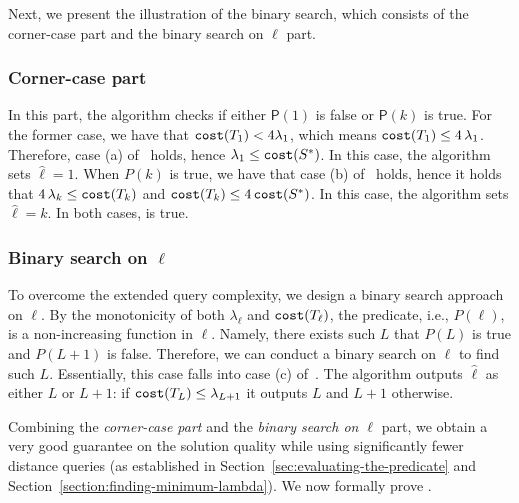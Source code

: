\documentclass{article}
\begin{document}
Next, we present the illustration of the binary search, which consists of the corner-case part and the binary search on $\ell$ part. 

\subsubsection{Corner-case part}\label{sec:basecase}
In this part, the algorithm checks if either $\mathsf{P}(1)$ is false or $\mathsf{P}(k)$ is true.
For the former case, we have that $\texttt{cost}(T_{1}) < 4 \lambda_1$, which means $\texttt{cost}(T_{1}) \leq 4\,\lambda_{1}$. Therefore,  case (a) of~  holds,  hence $\lambda_1 \leq \texttt{cost}(S^*)$.
In this case, the algorithm sets $\hat{\ell}=1$.
    When $P(k)$ is true, we have that case (b) of~ holds, hence it holds that $4\,\lambda_{k} \leq \texttt{cost}(T_{k})$ and $\texttt{cost}(T_{k}) \leq 4\,\texttt{cost}(S^*)$.   In this case, the algorithm sets $\hat{\ell}=k$. In both cases,  is true.

\subsubsection{Binary search on $\ell$}
\label{sec:binary-search-on-ell}

To overcome the extended query complexity, we design a binary search approach on $\ell$. 
By the monotonicity of both $\lambda_{\ell}$ and $\texttt{cost}(T_{\ell})$, the predicate, i.e., $P(\ell)$, is a non-increasing function in $\ell$. 
Namely, there exists such $L$ that $P(L)$ is true and $P(L+1)$ is false. 
Therefore, we can conduct a binary search on $\ell$ to find such $L$. 
Essentially, this case falls into case (c) of~.
The algorithm outputs $\hat{\ell}$ as either $L$ or $L+1$: if $\texttt{cost}(T_{L}) \leq \lambda_{L+1}$ it outputs $L$ and $L+1$ otherwise.

\smallskip 

Combining the \emph{corner-case part} and the \emph{binary search on $\ell$} part, we obtain a very good guarantee on the solution quality while using significantly fewer distance queries (as established in Section~\ref{sec:evaluating-the-predicate} and Section~\ref{section:finding-minimum-lambda}). 
We now formally prove .
\end{document}
